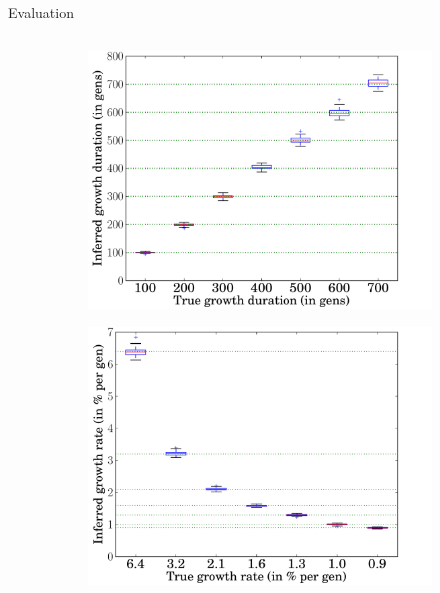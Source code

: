 \documentclass[final,hyperref={pdfpagelabels=false},professionalfonts,mathserif]{beamer}
\begin{document}
\begin{frame}[fragile]
\begin{columns}[t]
\begin{column}{.495\linewidth}
		\begin{block}{\large Evaluation} \justifying 
			\begin{columns}[T]
        	\begin{column}{0.97\linewidth}
				\begin{figure}[H]
				  \begin{subfigure}[b]{0.48\linewidth}
				      \centering
				      \includegraphics[type=pdf,ext=.pdf,read=.pdf,trim=0 0 0 1cm]{figs/our_method_nomad_allRuns_rho0.4_maxb18_boxPlotTOnsets}
				        \caption{}
				      \label{fig:inferred_params_1epoch_duration}
				    \end{subfigure}
				  \begin{subfigure}[b]{0.48\linewidth}
				      \centering
				      \includegraphics[type=pdf,ext=.pdf,read=.pdf,trim=0 0 0 1cm]{figs/our_method_nomad_allRuns_rho0.4_maxb18_boxPlotRs}

\end{subfigure}
\end{figure}
\end{column}
\end{columns}
\end{block}
\end{column}
\end{columns}
\end{frame}
\end{document}
